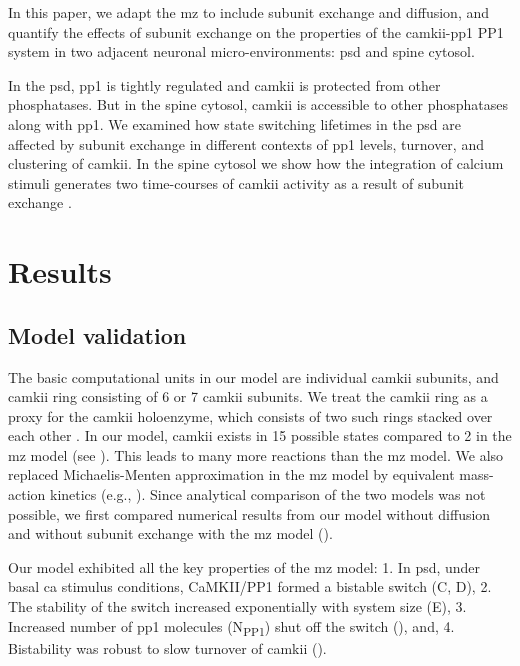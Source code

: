 \documentclass[9pt,lineno,doublespacing]{elife}
\newcommand\SUB[2]{#1\textsubscript{#2}}
\begin{document}
In this paper, we adapt the \gls{mz} \citep{miller_stability_2005} to include
subunit exchange and diffusion, and quantify the effects of subunit exchange on
the properties of the \gls{camkii}-\gls{pp1} PP1 system in two adjacent neuronal
micro-environments: \gls{psd} and spine cytosol. 

In the \gls{psd}, \gls{pp1} is tightly regulated and \gls{camkii} is protected
from other phosphatases. But in the spine cytosol, \gls{camkii} is accessible to
other phosphatases along with \gls{pp1}. We examined how state switching
lifetimes in the \gls{psd} are affected by subunit exchange in different
contexts of \gls{pp1} levels, turnover, and clustering of \gls{camkii}. In the
spine cytosol we show how the integration of calcium stimuli generates two
time-courses of \gls{camkii} activity as a result of subunit exchange
\citep{chang_camkii_2017}.

\section{Results}\label{sec:results} 

\subsection{Model validation}\label{subsec:model-validation}

The basic computational units in our model are individual \gls{camkii} subunits,
and \gls{camkii} ring consisting of 6 or 7 \gls{camkii} subunits. We treat the
\gls{camkii} ring as a proxy for the \gls{camkii} holoenzyme, which consists of
two such rings stacked over each other
\citep{woodgett_calmodulin-dependent,hoelz_crystal_2003,chao_mechanism_2011}. In
our model, \gls{camkii} exists in 15 possible states compared to 2 in the
\gls{mz} model (see ). This leads to many
more reactions than the \gls{mz} model. We also replaced Michaelis-Menten
approximation in the \gls{mz} model by equivalent mass-action kinetics (e.g.,
).  Since analytical comparison of the two models was not
possible, we first compared numerical results from our model without diffusion
and without subunit exchange with the \gls{mz} model ().

Our model exhibited all the key properties of the \gls{mz} model: 1. In
\gls{psd}, under basal \gls{ca} stimulus conditions, CaMKII/PP1 formed a
bistable switch (C, D), 2. The stability of the switch increased
exponentially with system size (E), 3. Increased number of
\gls{pp1} molecules (\SUB{N}{PP1}) shut off the switch (),
and, 4. Bistability was robust to slow turnover of \gls{camkii}
().
\end{document}
